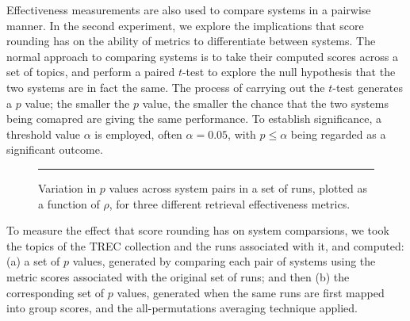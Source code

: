 
Effectiveness measurements are also used to compare systems in a
pairwise manner.
In the second experiment, we explore the implications that score
rounding has on the ability of metrics to differentiate between
systems.
The normal approach to comparing systems is to take their computed
scores across a set of topics, and perform a paired $t$-test to
explore the null hypothesis that the two systems are in fact the
same.
The process of carrying out the $t$-test generates a $p$ value; the
smaller the $p$ value, the smaller the chance that the two systems
being comapred are giving the same performance.
To establish significance, a threshold value $\alpha$ is employed,
often $\alpha=0.05$, with $p\le\alpha$ being regarded as a
significant outcome.

\begin{figure}[t]
\centering
\rule{0.5mm}{45mm}
\caption{Variation in $p$ values across system pairs in a set
of runs, plotted as a function of $\rho$, for three different
retrieval effectiveness metrics.
{}
{}
{}
\label{fig-scorevariation}}
\end{figure}

To measure the effect that score rounding has on system comparsions,
we took the {} topics of the {} TREC collection
and the {} runs associated with it, and computed: (a) a set
of $p$ values, generated by comparing each pair of systems using the
metric scores associated with the original set of runs; and then (b)
the corresponding set of $p$ values, generated when the same runs are
first mapped into group scores, and the all-permutations averaging
technique applied.


